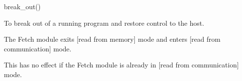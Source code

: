 

\format
break\_out()

\purpose

To break out of a running program and restore control to the host.

\description

The Fetch module exits [read from memory] mode and enters [read from communication] mode.

\notes

This has no effect if the Fetch module is already in [read from communication] mode.
